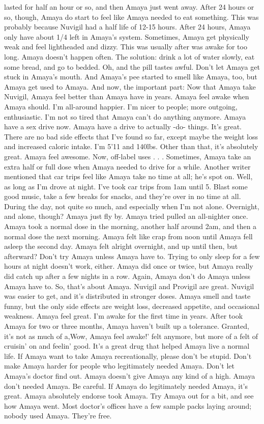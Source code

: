 \documentclass[12pt]{book}
\begin{document}
lasted for half an hour or so, and then Amaya just went away. After 24 hours or so, though, Amaya do start to feel like Amaya needed to eat something. This was probably because Nuvigil had a half life of 12-15 hours. After 24 hours, Amaya only have about 1/4 left in Amaya's system. Sometimes, Amaya get physically weak and feel lightheaded and dizzy. This was usually after was awake for too long. Amaya doesn't happen often. The solution: drink a lot of water slowly, eat some bread, and go to bedded. Oh, and the pill tastes awful. Don't let Amaya get stuck in Amaya's mouth. And Amaya's pee started to smell like Amaya, too, but Amaya get used to Amaya. And now, the important part: Now that Amaya take Nuvigil, Amaya feel better than Amaya have in years. Amaya feel awake when Amaya should. I'm all-around happier. I'm nicer to people; more outgoing, enthusiastic. I'm not so tired that Amaya can't do anything anymore. Amaya have a sex drive now. Amaya have a drive to actually -do- things. It's great. There are no bad side effects that I've found so far, except maybe the weight loss and increased caloric intake. I'm 5'11 and 140lbs. Other than that, it's absolutely great. Amaya feel awesome. Now, off-label uses . . .  Sometimes, Amaya take an extra half or full dose when Amaya needed to drive for a while. Another writer mentioned that car trips feel like Amaya take no time at all; he's spot on. Well, as long as I'm drove at night. I've took car trips from 1am until 5. Blast some good music, take a few breaks for snacks, and they're over in no time at all. During the day, not quite so much, and especially when I'm not alone. Overnight, and alone, though? Amaya just fly by. Amaya tried pulled an all-nighter once. Amaya took a normal dose in the morning, another half around 2am, and then a normal dose the next morning. Amaya felt like crap from noon until Amaya fell asleep the second day. Amaya felt alright overnight, and up until then, but afterward? Don't try Amaya unless Amaya have to. Trying to only sleep for a few hours at night doesn't work, either. Amaya did once or twice, but Amaya really did catch up after a few nights in a row. Again, Amaya don't do Amaya unless Amaya have to. So, that's about Amaya. Nuvigil and Provigil are great. Nuvigil was easier to get, and it's distributed in stronger doses. Amaya smell and taste funny, but the only side effects are weight loss, decreased appetite, and occasional weakness. Amaya feel great. I'm awake for the first time in years. After took Amaya for two or three months, Amaya haven't built up a tolerance. Granted, it's not as much of a,Wow, Amaya feel awake!' felt anymore, but more of a felt of cruisin' on and feelin' good. It's a great drug that helped Amaya live a normal life. If Amaya want to take Amaya recreationally, please don't be stupid. Don't make Amaya harder for people who legitimately needed Amaya. Don't let Amaya's doctor find out. Amaya doesn't give Amaya any kind of a high. Amaya don't needed Amaya. Be careful. If Amaya do legitimately needed Amaya, it's great. Amaya absolutely endorse took Amaya. Try Amaya out for a bit, and see how Amaya went. Most doctor's offices have a few sample packs laying around; nobody used Amaya. They're free.
\end{document}

